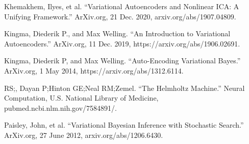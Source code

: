 \begin{thebibliography}{9}
Khemakhem, Ilyes, et al. “Variational Autoencoders and Nonlinear ICA: A Unifying Framework.” ArXiv.org, 21 Dec. 2020, arxiv.org/abs/1907.04809.

Kingma, Diederik P., and Max Welling. “An Introduction to Variational Autoencoders.” ArXiv.org, 11 Dec. 2019, https://arxiv.org/abs/1906.02691.

Kingma, Diederik P, and Max Welling. “Auto-Encoding Variational Bayes.” ArXiv.org, 1 May 2014, https://arxiv.org/abs/1312.6114.

RS;, Dayan P;Hinton GE;Neal RM;Zemel. “The Helmholtz Machine.” Neural Computation, U.S. National Library of Medicine, pubmed.ncbi.nlm.nih.gov/7584891/.

Paisley, John, et al. “Variational Bayesian Inference with Stochastic Search.” ArXiv.org, 27 June 2012, arxiv.org/abs/1206.6430.
\end{thebibliography}
